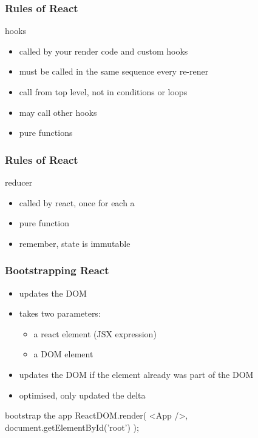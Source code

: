 \begin{frame}[fragile] \frametitle{Rules of React}
hooks
\begin{itemize}
  \item called by your render code and custom hooks
  \item must be called in the same sequence every re-rener
  \item call from top level, not in conditions or loops
  \item may call other hooks
  \item pure functions
\end{itemize}
\end{frame}
\begin{frame}[fragile] \frametitle{Rules of React}
reducer
\begin{itemize}
  \item called by react, once for each a 
  \item pure function
  \item remember, state is immutable
\end{itemize}
\end{frame}

\begin{frame}[fragile] \frametitle{Bootstrapping React}
\begin{itemize}
  \item updates the DOM
  \item takes two parameters:
  \begin{itemize}
    \item a react element (JSX expression)
    \item a DOM element
  \end{itemize}
  \item updates the DOM if the element already was part of the DOM
  \item optimised, only updated the delta
\end{itemize}
\begin{CodeBox}{bootstrap the app}
ReactDOM.render(
   <App />,
  document.getElementById('root')
);
\end{CodeBox}
\end{frame}

